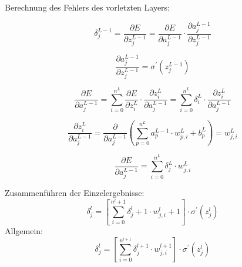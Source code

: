 \documentclass{article}
\begin{document}
Berechnung des Fehlers des vorletzten Layers:

\[ \delta_j^{L-1}  = \frac{\partial E}{\partial z_j^{L-1}} 
= \frac{\partial E}{\partial a_j^{L-1}} \cdot \frac{\partial a_j^{L-1}}{\partial z_j^{L-1}} \]

\[ \frac{\partial a_j^{L-1}}{\partial z_j^{L-1}} = \sigma^{\prime}(z_j^{L-1}) \]

\[ \frac{\partial E}{\partial a_j^{L-1}} = \sum_{i 
= 0}^{n^L} \frac{\partial E}{\partial z_i^L} \cdot \frac{\partial z_i^L}{\partial a_j^{L-1}}
= \sum_{i = 0}^{n^L} \delta_i^L \cdot \frac{\partial z_i^L}{\partial a_j^{L-1}} \]

\[\frac{\partial z_i^L}{\partial a_j^{L-1}}
= \frac{\partial}{\partial a_j^{L-1}} (\sum_{p = 0}^{n^L} a_p^{L-1} \cdot w_{p,i}^L + b_p^L) = w_{j, i}^L \]

\[ \frac{\partial E}{\partial a_j^{L-1}} = \sum_{i = 0}^{n^L} \delta_j^L \cdot w_{j,i}^L \]

Zusammenführen der Einzelergebnisse:
\[ \delta_j^{l} = [\sum_{i = 0}^{n^l+1} \delta_j^l+1 \cdot w_{j,i}^l+1] \cdot \sigma^{\prime}(z_j^{l}) \]
Allgemein:
\[ \delta_j^{l} = [\sum_{i = 0}^{n^{l+1}} \delta_j^{l+1} \cdot w_{j,i}^{l+1}] \cdot \sigma^{\prime}(z_j^{l}) \]
\end{document}

